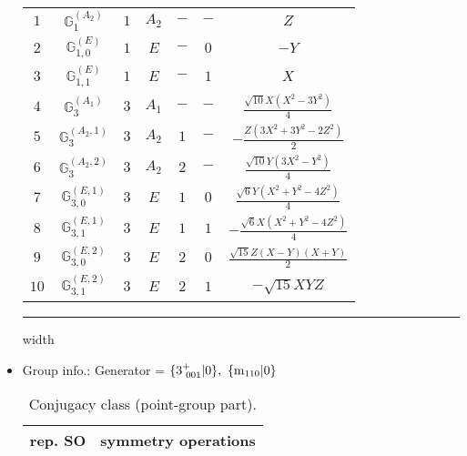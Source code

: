 \documentclass[fleqn,10pt,landscape]{article}
\begin{document}
\begin{itemize}
\begin{center}
\begin{longtable}{ccccccc}
$ 1 $ & $ \mathbb{G}_{1}^{(A_{2})} $ & $ 1 $ & $ A_{2} $ & $ - $ & $ - $ & $ Z $ \\
$ 2 $ & $ \mathbb{G}_{1,0}^{(E)} $ & $ 1 $ & $ E $ & $ - $ & $ 0 $ & $ - Y $ \\
$ 3 $ & $ \mathbb{G}_{1,1}^{(E)} $ & $ 1 $ & $ E $ & $ - $ & $ 1 $ & $ X $ \\ \hline
$ 4 $ & $ \mathbb{G}_{3}^{(A_{1})} $ & $ 3 $ & $ A_{1} $ & $ - $ & $ - $ & $ \frac{\sqrt{10} X \left(X^{2} - 3 Y^{2}\right)}{4} $ \\
$ 5 $ & $ \mathbb{G}_{3}^{(A_{2},1)} $ & $ 3 $ & $ A_{2} $ & $ 1 $ & $ - $ & $ - \frac{Z \left(3 X^{2} + 3 Y^{2} - 2 Z^{2}\right)}{2} $ \\
$ 6 $ & $ \mathbb{G}_{3}^{(A_{2},2)} $ & $ 3 $ & $ A_{2} $ & $ 2 $ & $ - $ & $ \frac{\sqrt{10} Y \left(3 X^{2} - Y^{2}\right)}{4} $ \\
$ 7 $ & $ \mathbb{G}_{3,0}^{(E,1)} $ & $ 3 $ & $ E $ & $ 1 $ & $ 0 $ & $ \frac{\sqrt{6} Y \left(X^{2} + Y^{2} - 4 Z^{2}\right)}{4} $ \\
$ 8 $ & $ \mathbb{G}_{3,1}^{(E,1)} $ & $ 3 $ & $ E $ & $ 1 $ & $ 1 $ & $ - \frac{\sqrt{6} X \left(X^{2} + Y^{2} - 4 Z^{2}\right)}{4} $ \\
$ 9 $ & $ \mathbb{G}_{3,0}^{(E,2)} $ & $ 3 $ & $ E $ & $ 2 $ & $ 0 $ & $ \frac{\sqrt{15} Z \left(X - Y\right) \left(X + Y\right)}{2} $ \\
$ 10 $ & $ \mathbb{G}_{3,1}^{(E,2)} $ & $ 3 $ & $ E $ & $ 2 $ & $ 1 $ & $ - \sqrt{15} X Y Z $ \\
\end{longtable}
\end{center}

 \hfil \hrule height 1mm width \textwidth \hfil

\item Group info.: Generator = $\{3^{+}_{\,\,001}|0\},\,\,\{{\rm m}_{110}|0\}$

\begin{center}
\renewcommand{\arraystretch}{1.3}
\begin{longtable}{c|l}
\caption{Conjugacy class (point-group part).}
 \\
 \hline \hline
rep. SO & symmetry operations \\ \hline \endfirsthead


\end{longtable}
\end{center}
\end{itemize}
\end{document}

